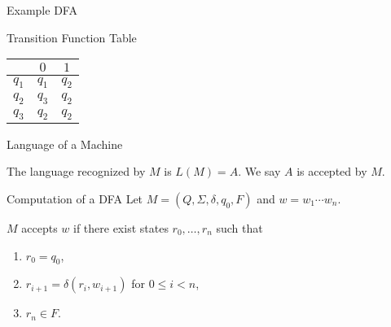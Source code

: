 \documentclass[aspectratio=169]{beamer}
\begin{document}
\begin{frame}{Example DFA}
  \begin{center}
  \end{center}
\end{frame}

\begin{frame}{Transition Function Table}
  \begin{center}
    \begin{tabular}{c|c c}
      & $0$ & $1$ \\ \hline
      $q_1$ & $q_1$ & $q_2$ \\
      $q_2$ & $q_3$ & $q_2$ \\
      $q_3$ & $q_2$ & $q_2$ \\
    \end{tabular}
  \end{center}
\end{frame}

\begin{frame}{Language of a Machine}
  \begin{definition}
    The language recognized by $M$ is $L(M) = A$. We say $A$ is accepted by $M$.
  \end{definition}
\end{frame}

\begin{frame}{Computation of a DFA}
  Let $M = (Q,\Sigma,\delta,q_0,F)$ and $w = w_1 \cdots w_n$.
  \begin{theorem}
    $M$ accepts $w$ if there exist states $r_0,\ldots,r_n$ such that
    \begin{enumerate}
      \item $r_0 = q_0$,
      \item $r_{i+1} = \delta(r_i, w_{i+1})$ for $0 \le i < n$,
      \item $r_n \in F$.
    \end{enumerate}
  \end{theorem}
\end{frame}
\end{document}
